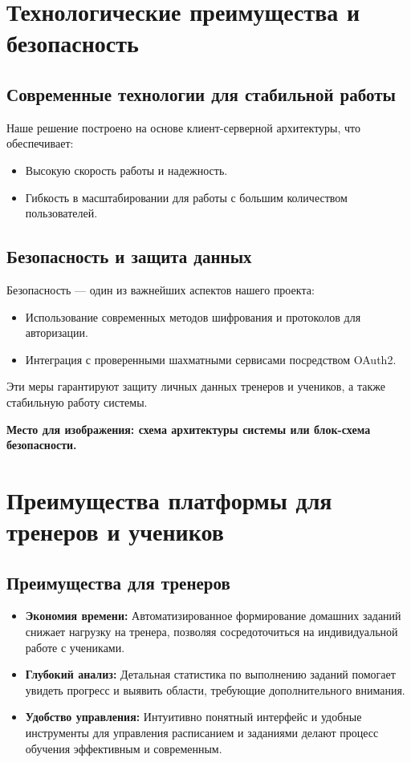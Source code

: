 \documentclass[a4paper,12pt]{article}
\begin{document}
\section{Технологические преимущества и безопасность}

\subsection{Современные технологии для стабильной работы}
Наше решение построено на основе клиент-серверной архитектуры, что обеспечивает:
\begin{itemize}
    \item Высокую скорость работы и надежность.
    \item Гибкость в масштабировании для работы с большим количеством пользователей.
\end{itemize}

\subsection{Безопасность и защита данных}
Безопасность --- один из важнейших аспектов нашего проекта:
\begin{itemize}
    \item Использование современных методов шифрования и протоколов для авторизации.
    \item Интеграция с проверенными шахматными сервисами посредством OAuth2.
\end{itemize}
Эти меры гарантируют защиту личных данных тренеров и учеников, а также стабильную работу системы.

\vspace{0.5cm}
\noindent
\textbf{Место для изображения: схема архитектуры системы или блок-схема безопасности.}
\begin{center}
\end{center}
\vspace{0.5cm}

\section{Преимущества платформы для тренеров и учеников}

\subsection{Преимущества для тренеров}
\begin{itemize}
    \item \textbf{Экономия времени:} Автоматизированное формирование домашних заданий снижает нагрузку на тренера, позволяя сосредоточиться на индивидуальной работе с учениками.
    \item \textbf{Глубокий анализ:} Детальная статистика по выполнению заданий помогает увидеть прогресс и выявить области, требующие дополнительного внимания.
    \item \textbf{Удобство управления:} Интуитивно понятный интерфейс и удобные инструменты для управления расписанием и заданиями делают процесс обучения эффективным и современным.
\end{itemize}
\end{document}
